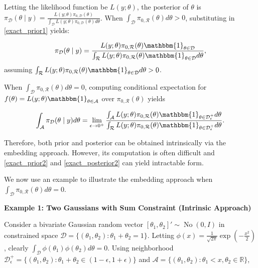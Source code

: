 \documentclass[10pt]{article}
\newcommand{\mc}[1]{\mathcal{#1}}
\DeclareMathOperator{\No}{No}
\DeclareMathOperator{\1}{\mathbbm{1}}
\begin{document}
Letting the likelihood function be $L(y;\theta)$, the posterior of $\theta$ is ${\pi}_{\mc D}(\theta \mid y) = \frac{ L(y;\theta) \pi_{0,\mc D}(\theta)}{{\int_\mc D}L(y;\theta) \pi_{0,\mc D}(\theta)d\theta}$. When $\int_{\mc D} \pi_{0,\mc R}(\theta)d\theta >0$, substituting in \eqref{exact_prior1} yields:

\begin{equation}
\label{exact_posterior1}
	{\pi}_{\mc D}(\theta \mid y) = \frac{ L(y;\theta)\pi_{0,\mc R}(\theta)\mathbbm{1}_{\theta\in \mc D} }{ \int_{\mc R} L(y;\theta)\pi_{0,\mc R}(\theta) \mathbbm{1}_{\theta\in \mc D}d\theta },
\end{equation}
assuming $\int_{\mc R} L(y;\theta)\pi_{0,\mc R}(\theta) \mathbbm{1}_{\theta\in \mc D}d\theta >0$.

When $\int_{\mc D} \pi_{0,\mc R}(\theta)d\theta =0$, computing conditional expectation for $f(\theta)= L(y;\theta)\mathbbm{1}_{\theta\in \mc A}$ over $\pi_{0,\mc R}(\theta)$ yields 

\begin{equation}
\label{exact_posterior2}
	\int_{\mc A} {\pi}_{\mc D}(\theta \mid y) d\theta = \lim_{\epsilon\rightarrow 0^+}  \frac{ \int_{\mc A}  L(y;\theta)\pi_{0,\mc R}(\theta)\mathbbm{1}_{\theta\in \mc D_\epsilon^+}  d\theta }{ \int_{\mc R} L(y;\theta)\pi_{0,\mc R}(\theta) \mathbbm{1}_{\theta\in \mc D_\epsilon^+}d\theta }.
\end{equation}

Therefore, both prior and posterior can be obtained intrinsically via the embedding approach. However, its computation is often difficult and \eqref{exact_prior2} and \eqref{exact_posterior2} can yield intractable form. 

We now use an example to illustrate the embedding approach when $\int_{\mc D} \pi_{0,\mc R}(\theta)d\theta =0$.

{\bf Example 1: Two Gaussians with Sum Constraint (Intrinsic Approach)}

Consider a bivariate Gaussian random vector $[\theta_1,\theta_2]' \sim \No(0,I)$ in constrained space $\mc D=\{(\theta_1,\theta_2):\theta_1+\theta_2=1\}$. Letting $\phi(x)= \frac{1}{\sqrt{2\pi}} \exp(-\frac{x^2}{2})$, clearly $\int_{\mc D} \phi(\theta_1)\phi(\theta_2)d\theta =0$. Using neighborhood $\mc D^+_\epsilon=\{(\theta_1,\theta_2):\theta_1+\theta_2 \in (1-\epsilon, 1+\epsilon)\}$ and $\mc A= \{(\theta_1,\theta_2): \theta_1< x, \theta_2\in \mathbb R\}$,
\end{document}
